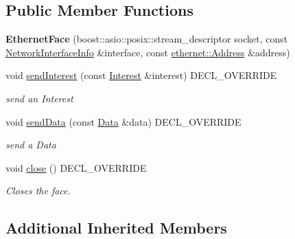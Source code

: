 \subsection*{Public Member Functions}
\begin{DoxyCompactItemize}
\item 
{\bfseries Ethernet\+Face} (boost\+::asio\+::posix\+::stream\+\_\+descriptor socket, const \hyperlink{classnfd_1_1NetworkInterfaceInfo}{Network\+Interface\+Info} \&interface, const \hyperlink{classndn_1_1util_1_1ethernet_1_1Address}{ethernet\+::\+Address} \&address)\hypertarget{classnfd_1_1EthernetFace_aecd33637a404fd2772a5fec9c565a6fe}{}\label{classnfd_1_1EthernetFace_aecd33637a404fd2772a5fec9c565a6fe}

\item 
void \hyperlink{classnfd_1_1EthernetFace_a86405c58e9ffe464bb508680b9922ae7}{send\+Interest} (const \hyperlink{classndn_1_1Interest}{Interest} \&interest) D\+E\+C\+L\+\_\+\+O\+V\+E\+R\+R\+I\+DE\hypertarget{classnfd_1_1EthernetFace_a86405c58e9ffe464bb508680b9922ae7}{}\label{classnfd_1_1EthernetFace_a86405c58e9ffe464bb508680b9922ae7}

\begin{DoxyCompactList}\small\item\em send an Interest \end{DoxyCompactList}\item 
void \hyperlink{classnfd_1_1EthernetFace_aee1163cd7ec7614aa410e474e550e6f8}{send\+Data} (const \hyperlink{classndn_1_1Data}{Data} \&data) D\+E\+C\+L\+\_\+\+O\+V\+E\+R\+R\+I\+DE\hypertarget{classnfd_1_1EthernetFace_aee1163cd7ec7614aa410e474e550e6f8}{}\label{classnfd_1_1EthernetFace_aee1163cd7ec7614aa410e474e550e6f8}

\begin{DoxyCompactList}\small\item\em send a Data \end{DoxyCompactList}\item 
void \hyperlink{classnfd_1_1EthernetFace_a03dc750b6519a5de012cf6e42f78b204}{close} () D\+E\+C\+L\+\_\+\+O\+V\+E\+R\+R\+I\+DE
\begin{DoxyCompactList}\small\item\em Closes the face. \end{DoxyCompactList}\end{DoxyCompactItemize}
\subsection*{Additional Inherited Members}


